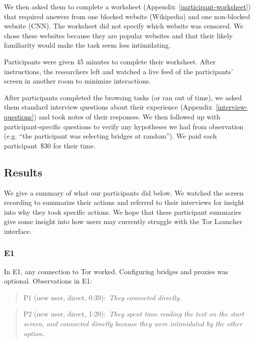 \documentclass[USenglish,oneside,twocolumn]{article}
\newcommand{\pquote}[2]{
\begin{quotation}
\noindent #1:~\textit{#2}
\end{quotation}
}
\begin{document}
We then asked them to complete a worksheet (Appendix~\ref{participant-worksheet}) that 
required answers from one blocked website (Wikipedia) and one non-blocked website (CNN).
The worksheet did not specify which website was censored. 
We chose these websites because they are popular websites and that their likely familiarity 
would make the task seem less intimidating. 

Participants were given 45 minutes to complete their worksheet. 
After instructions, the researchers left and watched a live feed of the participants' screen in another room to minimize interactions.

After participants completed the browsing tasks (or ran out of time),
we asked them standard interview questions about their experience (Appendix~\ref{interview-questions}) and took notes of their responses. We then followed up with participant-specific questions to verify any hypotheses   we had from observation (e.g. ``the participant was selecting bridges at random''). We paid each participant~\$30 for their time. 

\subsection{Results} 
We give a summary of what our participants did below. We watched the screen recording to summarize their actions and referred to their interviews for insight into why they took specific actions. We hope that these participant summaries give some insight into how users may currently struggle with the Tor Launcher interface.



\subsubsection{E1} 
In E1, any connection to Tor worked. Configuring bridges and proxies was optional.  
Observations in E1: 

\pquote{P1 (new user, direct, 0:39)}{They connected directly.}

\pquote{P2 (new user, direct, 1:20)}{They spent time reading the text on the start screen, and connected directly because they were intimidated by the other option.}
\end{document}

